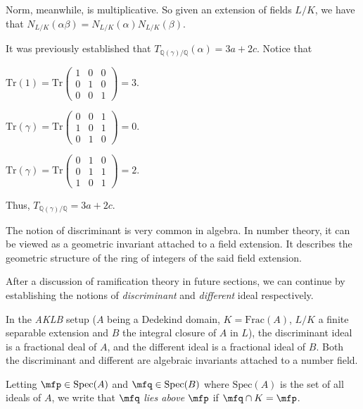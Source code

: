 \documentclass[a4paper, 12pt,oneside,openany]{book}
\begin{document}
Norm, meanwhile, is multiplicative. So given an extension of fields $L/K$, we have that $N_{L/K}(\alpha\beta) = N_{L/K}(\alpha)N_{L/K}(\beta).$

It was previously established that $T_{\mathbb{Q}(\gamma)/\mathbb{Q}}(\alpha)=3a+2c.$ Notice that 

$\text{Tr}(1)= \text{Tr}\begin{pmatrix}
    1 & 0 & 0 \\
    0 & 1 & 0 \\
    0 & 0 & 1
\end{pmatrix} = 3.$

$\text{Tr}(\gamma)= \text{Tr}\begin{pmatrix}
    0 & 0 & 1 \\
    1 & 0 & 1 \\
    0 & 1 & 0
\end{pmatrix} = 0.$

$\text{Tr}(\gamma)= \text{Tr}\begin{pmatrix}
    0 & 1 & 0 \\
    0 & 1 & 1 \\
    1 & 0 & 1
\end{pmatrix} = 2.$

Thus, $T_{\mathbb{Q}(\gamma)/\mathbb{Q}}=3a+2c.$

The notion of discriminant is very common in algebra. In number theory, it can be viewed as a geometric invariant attached to a field extension. It describes the geometric structure of the ring of integers of the said field extension. 

After a discussion of ramification theory in future sections, we can continue by establishing the notions of \emph{discriminant} and \emph{different} ideal respectively. 

In the \emph{AKLB} \label{AKLB} setup ($A$ being a Dedekind domain, $K=\text{Frac}(A)$, $L/K$ a finite separable extension and $B$ the integral closure of $A$ in $L$), the discriminant ideal is a fractional deal of $A$, and the different ideal is a fractional ideal of $B$. Both the discriminant and different are algebraic invariants attached to a number field.

Letting $\mfp \in \text{Spec}(A)$ and $\mfq \in \text{Spec}(B)$ where $\text{Spec}(A)$ is the set of all ideals of $A$, we write that $\mfq$ \emph{lies above $\mfp$} if $\mfq \cap K =\mfp$.
\end{document}
